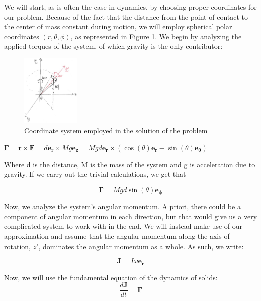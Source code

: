 \documentclass[a4paper,12pt]{article}
\begin{document}
We will start, as is often the case in dynamics, by choosing proper coordinates for our problem. Because of the fact that the distance from the point of contact to the center of mass constant during motion, we will employ spherical polar coordinates $(r,\theta,\phi)$, as represented in Figure \ref{coord_system}. We begin by analyzing the applied torques of the system, of which gravity is the only contributor:

\begin{figure}[h!]
\centering
\includegraphics[width=0.25\textwidth]{coord.jpg}
\caption{Coordinate system employed in the solution of the problem}
\label{coord_system}
\end{figure} 

$\boldsymbol{\Gamma} = \boldsymbol{r} \times \boldsymbol{F} = d \boldsymbol{e_r} \times M g \boldsymbol{e_z} = M g d \boldsymbol{e_r} \times (\cos(\theta) \boldsymbol{e_r}-\sin(\theta) \boldsymbol{e_\theta})$

Where d is the distance, M is the mass of the system and g is acceleration due to gravity. If we carry out the trivial calculations, we get that 

\begin{equation}
	\label{torque}
	\boldsymbol{\Gamma} = M g d \sin(\theta) \boldsymbol{e_{\phi}}
\end{equation}

Now, we analyze the system's angular momentum. A priori, there could be a component of angular momentum in each direction, but that would give us a very complicated system to work with in the end. We will instead make use of our approximation and assume that the angular momentum along the axis of rotation, $z'$, dominates the angular momentum as a whole. As such, we write:

\begin{equation}
\label{angular}
	\boldsymbol{J} = I \omega \boldsymbol{e_r}
\end{equation}

Now, we will use the fundamental equation of the dynamics of solids:
\begin{equation}
	\label{fund}
	\frac{d \boldsymbol{J}}{dt} = \boldsymbol{\Gamma}	
\end{equation}
\end{document}
